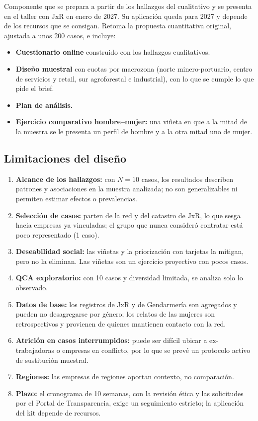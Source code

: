 Componente que se prepara a partir de los hallazgos del cualitativo y se presenta en el taller con JxR en enero de 2027. Su aplicación queda para 2027 y depende de los recursos que se consigan. Retoma la propuesta cuantitativa original, ajustada a unos 200 casos, e incluye:

\begin{itemize}
    \item \textbf{Cuestionario online} construido con los hallazgos cualitativos.
    \item \textbf{Diseño muestral} con cuotas por macrozona (norte minero-portuario, centro de servicios y retail, sur agroforestal e industrial), con lo que se cumple lo que pide el brief.
    \item \textbf{Plan de análisis.}
    \item \textbf{Ejercicio comparativo hombre--mujer:} una viñeta en que a la mitad de la muestra se le presenta un perfil de hombre y a la otra mitad uno de mujer.
\end{itemize}

\subsection{Limitaciones del diseño}

\begin{enumerate}
    \item \textbf{Alcance de los hallazgos:} con $N = 10$ casos, los resultados describen patrones y asociaciones en la muestra analizada; no son generalizables ni permiten estimar efectos o prevalencias.
    \item \textbf{Selección de casos:} parten de la red y del catastro de JxR, lo que sesga hacia empresas ya vinculadas; el grupo que nunca consideró contratar está poco representado (1 caso).
    \item \textbf{Deseabilidad social:} las viñetas y la priorización con tarjetas la mitigan, pero no la eliminan. Las viñetas son un ejercicio proyectivo con pocos casos.
    \item \textbf{QCA exploratorio:} con 10 casos y diversidad limitada, se analiza solo lo observado.
    \item \textbf{Datos de base:} los registros de JxR y de Gendarmería son agregados y pueden no desagregarse por género; los relatos de las mujeres son retrospectivos y provienen de quienes mantienen contacto con la red.
    \item \textbf{Atrición en casos interrumpidos:} puede ser difícil ubicar a ex-trabajadoras o empresas en conflicto, por lo que se prevé un protocolo activo de sustitución muestral.
    \item \textbf{Regiones:} las empresas de regiones aportan contexto, no comparación.
    \item \textbf{Plazo:} el cronograma de 10 semanas, con la revisión ética y las solicitudes por el Portal de Transparencia, exige un seguimiento estricto; la aplicación del kit depende de recursos.
\end{enumerate}
